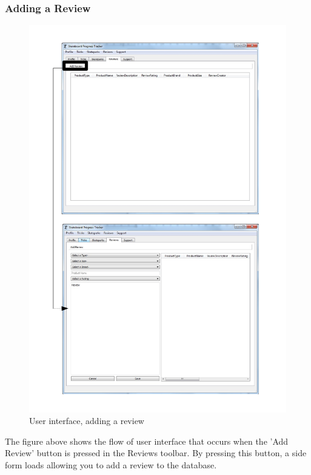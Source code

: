\subsubsection{Adding a Review}
\begin{figure}[H]
    \includegraphics[width=\textwidth]{./Maintenance/Figures/AddReview.pdf}
    \caption{User interface, adding a review} \label{fig:Add Review UI}
\end{figure}

The figure above shows the flow of user interface that occurs when the 'Add Review' button is pressed in the Reviews toolbar. By pressing this button, a side form loads allowing you to add a review to the database.

